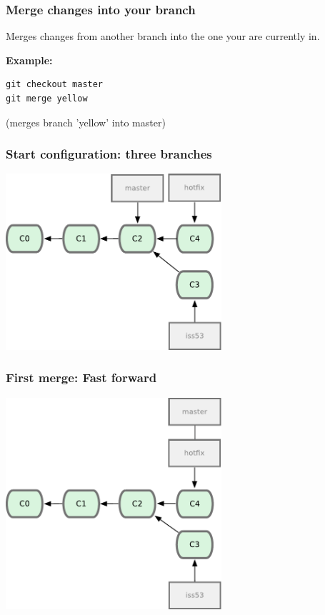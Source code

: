 \documentclass{gittalk}
\begin{document}
\begin{frame}[fragile]
\frametitle{Merge changes into your branch}
\begin{tcolorbox}[title=git merge]
Merges changes from another branch into the one your are currently in.
\end{tcolorbox}
\vspace*{1em}
\textbf{Example:}
\begin{lstlisting}
git checkout master
git merge yellow
\end{lstlisting}
(merges branch 'yellow' into master)
\end{frame}

\begin{frame}
  \frametitle{Start configuration: three branches}
\begin{center}
  \includegraphics[width=0.6\textwidth]{./img/fig0313.pdf}
\end{center}
\end{frame}

\begin{frame}
  \frametitle{First merge: Fast forward}
\begin{center}
  \includegraphics[width=0.6\textwidth]{./img/fig0314.pdf}
\end{center}
\end{frame}
\end{document}
